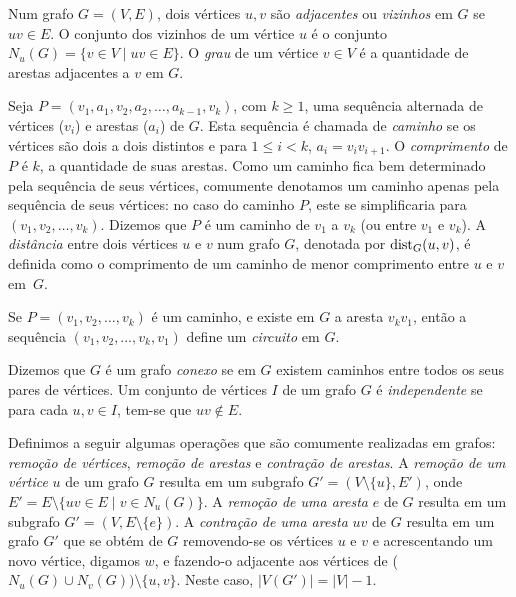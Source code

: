 
Num grafo $G=(V,E)$, dois vértices $u,v$ são \emph{adjacentes} ou \emph{vizinhos} em $G$ se $uv \in E$. O conjunto dos vizinhos de um vértice $u$ é o conjunto 
 $N_{u}(G)= \{v \in V\; |\; uv \in E\}$. O \emph{grau} de um vértice $v \in V$ é a quantidade de arestas adjacentes a $v$ em $G$.

 Seja $P = (v_1,a_1, v_2,a_2, \ldots, a_{k-1},v_k)$, com $k\ge 1$, uma sequência alternada de vértices ($v_i$) e arestas ($a_i$) de $G$.  Esta sequência é chamada de \emph{caminho} se os vértices são dois a dois distintos e para $1 \le i < k$, $a_i = v_{i}v_{i+1}$. O \emph{comprimento} de $P$ é $k$, a quantidade de suas arestas. Como um caminho fica bem determinado pela sequência de seus vértices, comumente denotamos um caminho apenas pela sequência de seus vértices: no caso do caminho $P$, este se simplificaria para $(v_1,v_2,\ldots,v_k)$. Dizemos que $P$ é um caminho de $v_1$ a $v_k$ (ou entre $v_1$ e $v_k$). A \emph{distância} entre dois vértices $u$ e $v$ num grafo $G$, denotada por ${\mathrm{dist}}_{G}(u,v)$,  é definida como o comprimento de um caminho de menor comprimento entre $u$ e $v$ em~$G$.

Se $P = (v_1,v_2,\ldots,v_k)$ é um caminho, e existe em $G$ a aresta $v_kv_1$, então a sequência $(v_1,v_2,\ldots,v_k,v_1)$ define um \emph{circuito} em $G$.

Dizemos que $G$ é um grafo \emph{conexo} se em $G$ existem caminhos entre todos os seus pares de vértices.  Um conjunto de vértices $I$  de um grafo $G$ é \emph{independente} se para cada $u,v \in I$, tem-se que $uv \notin E$.

Definimos a seguir algumas operações que são comumente realizadas em
grafos: \emph{remoção de vértices}, \emph{remoção de arestas} e
\emph{contração de arestas}. A \emph{remoção de um vértice} $u$ de um
grafo $G$ resulta em um subgrafo $G'=(V \setminus \{u\},E')$, onde $E'
= E \setminus \{uv\in E \; | \; v\in N_{u}(G) \}$. A \emph{remoção de uma aresta} $e$ de $G$ resulta em um subgrafo $G'=(V,E \setminus \{e\})$. A \emph{contração de uma aresta} $uv$ de $G$ resulta em um grafo $G'$ que se obtém de $G$ removendo-se os vértices $u$ e $v$ e acrescentando um novo vértice, digamos $w$, e fazendo-o adjacente aos vértices   
de ($N_{u}(G) \cup N_{v}(G))\setminus\{u,v\}$. Neste caso, $|V(G')| = |V|-1$.


